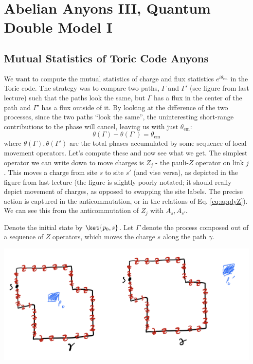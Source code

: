\section{Abelian Anyons III, Quantum Double Model I}

\subsection{Mutual Statistics of Toric Code Anyons}
We want to compute the mutual statistics of charge and flux statistics $e^{i\theta_{\text{em}}}$ in the Toric code. The strategy was to compare two paths, $\Gamma$ and $\Gamma'$ (see figure from last lecture) such that the paths look the same, but $\Gamma$ has a flux in the center of the path and $\Gamma'$ has a flux outside of it. By looking at the difference of the two processes, since the two paths ``look the same'', the uninteresting short-range contributions to the phase will cancel, leaving us with just $\theta_{\text{em}}$:
\begin{equation}
    \theta(\Gamma) - \theta(\Gamma') = \theta_{\text{em}}
\end{equation}
where $\theta(\Gamma), \theta(\Gamma')$ are the total phases accumulated by some sequence of local movement operators. Let's compute these and now see what we get. The simplest operator we can write down to move charges is $Z_j$ - the pauli-$Z$ operator on link $j$. This moves a charge from site $s$ to site $s'$ (and vise versa), as depicted in the figure from last lecture (the figure is slightly poorly notated; it should really depict movement of charges, as opposed to swapping the site labels. The precise action is captured in the anticommutation, or in the relations of Eq. \eqref{eq:applyZ}). We can see this from the anticommutation of $Z_j$ with $A_s, A_{s'}$.

Denote the initial state by $\ket{p_0, s}$. Let $\Gamma$ denote the process composed out of a sequence of $Z$ operators, which moves the charge $s$ along the path $\gamma$.

\begin{center}
    \includegraphics[scale=0.35]{Lectures/Images/lec6-twopaths.png}
\end{center}

